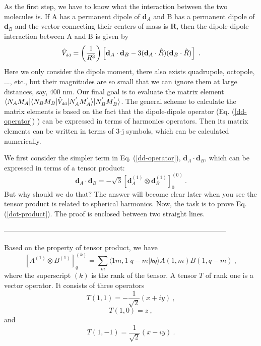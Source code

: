 As the first step, we have to know what the interaction between the two molecules is. If A has a permanent dipole of $\mathbf{d}_{A}$ and B has a permanent dipole of $\mathbf{d}_{B}$ and the vector connecting their centers of mass is $\mathbf{R}$, then the dipole-dipole interaction between A and B is given by
\begin{equation}
\hat{V}_{\mbox{\tiny dd}} = \left(\frac{1}{R^3}\right)\left[ \mathbf{d}_{A}\cdot\mathbf{d}_{B}-3(\mathbf{d}_{A}\cdot\hat{R})(\mathbf{d}_{B}\cdot\hat{R})\right]  \ . \label{dd-operator}
\end{equation}
Here we only consider the dipole moment, there also exists quadrupole, octopole, ..., etc., but their magnitudes are so small that we can ignore them at large distances, say, 400 nm. Our final goal is to evaluate the matrix element $\langle N_{A}M_{A}|\langle N_{B}M_{B} | \hat{V}_{\mbox{\tiny dd}}|N_{A}^{'}M_{A}^{'}\rangle |N_{B}^{'}M_{B}^{'}      \rangle$. The general scheme to calculate the matrix elements is based on the fact that the dipole-dipole operator (Eq. (\ref{dd-operator}) ) can be expressed in terms of harmonics operators. Then its matrix elements can be written in terms of 3-j symbols, which can be calculated numerically. 

We first consider the simpler term in Eq. (\ref{dd-operator}), $\mathbf{d}_{A}\cdot\mathbf{d}_{B}$, which can be expressed in terms of a tensor product:
\begin{equation}
\mathbf{d}_{A}\cdot\mathbf{d}_{B} = - \sqrt{3} \left[ \mathbf{d}_{A}^{(1)} \otimes \mathbf{d}_{B}^{(1)} \right]_{0}^{(0)} \ . \label{dot-product}
\end{equation}
But why should we do that? The answer will become clear later when you see the tensor product is related to spherical harmonics. Now, the task is to prove Eq. (\ref{dot-product}). The proof is enclosed between two straight lines. 

-----------------------------------------------------------------------------------------------

Based on the property of tensor product, we have
\begin{equation}
\left[ A^{(1)} \otimes B^{(1)} \right]_{q}^{(k)} =\sum_{m} \langle 1m, 1\;q-m | kq \rangle A(1,m)B(1, q-m) \ , \label{tensor-product}
\end{equation}
where the superscript $(k)$ is the rank of the tensor. A tensor $T$ of rank one is a vector operator. It consists of three operators 
\begin{equation}
T(1,1) = - \frac{1}{\sqrt{2}} (x + i y) \ , \label{t11}
\end{equation}
\begin{equation}
T(1,0) = z \ , \label{t10}
\end{equation}
and 
\begin{equation}
T(1,-1) =  \frac{1}{\sqrt{2}} (x - i y) \ .  \label{t1-1}
\end{equation}

